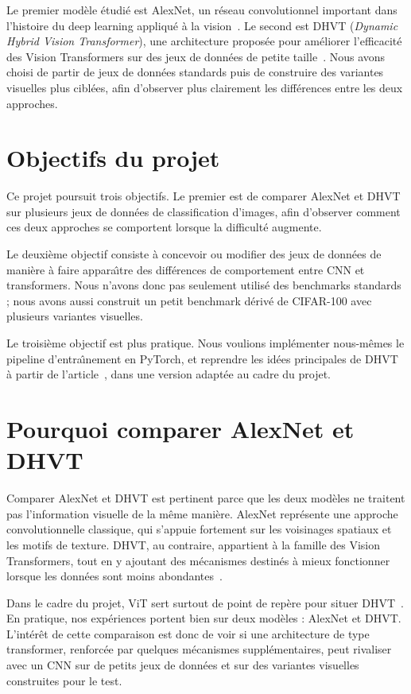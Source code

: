 \documentclass[11pt,a4paper]{article}
\begin{document}
Le premier mod\`ele \'etudi\'e est AlexNet, un r\'eseau convolutionnel important dans l'histoire du deep learning appliqu\'e \`a la vision~\cite{alexnet}. Le second est DHVT (\textit{Dynamic Hybrid Vision Transformer}), une architecture propos\'ee pour am\'eliorer l'efficacit\'e des Vision Transformers sur des jeux de donn\'ees de petite taille~\cite{dhvt}. Nous avons choisi de partir de jeux de donn\'ees standards puis de construire des variantes visuelles plus cibl\'ees, afin d'observer plus clairement les diff\'erences entre les deux approches.

\section{Objectifs du projet}
Ce projet poursuit trois objectifs. Le premier est de comparer AlexNet et DHVT sur plusieurs jeux de donn\'ees de classification d'images, afin d'observer comment ces deux approches se comportent lorsque la difficult\'e augmente.

Le deuxi\`eme objectif consiste \`a concevoir ou modifier des jeux de donn\'ees de mani\`ere \`a faire appara\^\i tre des diff\'erences de comportement entre CNN et transformers. Nous n'avons donc pas seulement utilis\'e des benchmarks standards ; nous avons aussi construit un petit benchmark d\'eriv\'e de CIFAR-100 avec plusieurs variantes visuelles.

Le troisi\`eme objectif est plus pratique. Nous voulions impl\'ementer nous-m\^emes le pipeline d'entra\^\i nement en PyTorch, et reprendre les id\'ees principales de DHVT \`a partir de l'article~\cite{dhvt}, dans une version adapt\'ee au cadre du projet.

\section{Pourquoi comparer AlexNet et DHVT}
Comparer AlexNet et DHVT est pertinent parce que les deux mod\`eles ne traitent pas l'information visuelle de la m\^eme mani\`ere. AlexNet repr\'esente une approche convolutionnelle classique, qui s'appuie fortement sur les voisinages spatiaux et les motifs de texture. DHVT, au contraire, appartient \`a la famille des Vision Transformers, tout en y ajoutant des m\'ecanismes destin\'es \`a mieux fonctionner lorsque les donn\'ees sont moins abondantes~\cite{dhvt}.

Dans le cadre du projet, ViT sert surtout de point de rep\`ere pour situer DHVT~\cite{vit,dhvt}. En pratique, nos exp\'eriences portent bien sur deux mod\`eles : AlexNet et DHVT. L'int\'er\^et de cette comparaison est donc de voir si une architecture de type transformer, renforc\'ee par quelques m\'ecanismes suppl\'ementaires, peut rivaliser avec un CNN sur de petits jeux de donn\'ees et sur des variantes visuelles construites pour le test.
\end{document}
